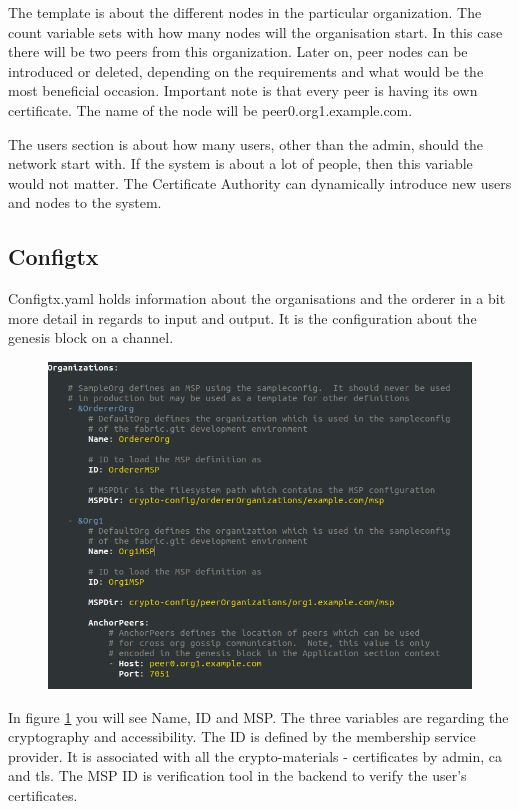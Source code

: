 \documentclass[a4paper,11pt]{report}
\begin{document}
The template is about the different nodes in the particular organization. The count variable sets with how many nodes will the organisation start. In this case there will be two peers from this organization. Later on, peer nodes can be introduced or deleted, depending on the requirements and what would be the most beneficial occasion. Important note is that every peer is having its own certificate. The name of the node will be peer0.org1.example.com. 

The users section is about how many users, other than the admin, should the network start with. If the system is about a lot of people, then this variable would not matter. The Certificate Authority can dynamically introduce new users and nodes to the system. 

\subsection{Configtx}

Configtx.yaml holds information about the organisations and the orderer in a bit more detail in regards to input and output. It is the configuration about the genesis block on a channel. 

\begin{figure}[h]
\centering
  \includegraphics[width = 16cm]{configtx1.png}
  \caption{ }
  \label{configtx1}
\end{figure}

In figure \ref{configtx1} you will see Name, ID and MSP. The three variables are regarding the cryptography and accessibility. The ID is defined by the membership service provider. It is associated with all the crypto-materials - certificates by admin, ca and tls. The MSP ID is verification tool in the backend to verify the user’s certificates.
  
\end{document}
